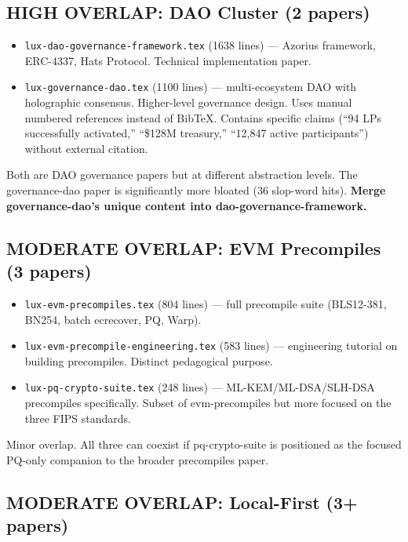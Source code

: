 \documentclass[11pt,a4paper]{article}
\begin{document}
\subsection{HIGH OVERLAP: DAO Cluster (2 papers)}

\begin{itemize}
\item \texttt{lux-dao-governance-framework.tex} (1638 lines) --- Azorius
      framework, ERC-4337, Hats Protocol. Technical implementation paper.
\item \texttt{lux-governance-dao.tex} (1100 lines) --- multi-ecosystem DAO
      with holographic consensus. Higher-level governance design. Uses manual
      numbered references instead of BibTeX. Contains specific claims
      (``94 LPs successfully activated,'' ``\$128M treasury,'' ``12,847 active
      participants'') without external citation.
\end{itemize}

Both are DAO governance papers but at different abstraction levels. The
governance-dao paper is significantly more bloated (36 slop-word hits).
\textbf{Merge governance-dao's unique content into dao-governance-framework.}

\subsection{MODERATE OVERLAP: EVM Precompiles (3 papers)}

\begin{itemize}
\item \texttt{lux-evm-precompiles.tex} (804 lines) --- full precompile suite
      (BLS12-381, BN254, batch ecrecover, PQ, Warp).
\item \texttt{lux-evm-precompile-engineering.tex} (583 lines) --- engineering
      tutorial on building precompiles. Distinct pedagogical purpose.
\item \texttt{lux-pq-crypto-suite.tex} (248 lines) --- ML-KEM/ML-DSA/SLH-DSA
      precompiles specifically. Subset of evm-precompiles but more focused on
      the three FIPS standards.
\end{itemize}

Minor overlap. All three can coexist if pq-crypto-suite is positioned as the
focused PQ-only companion to the broader precompiles paper.

\subsection{MODERATE OVERLAP: Local-First (3+ papers)}
\end{document}
